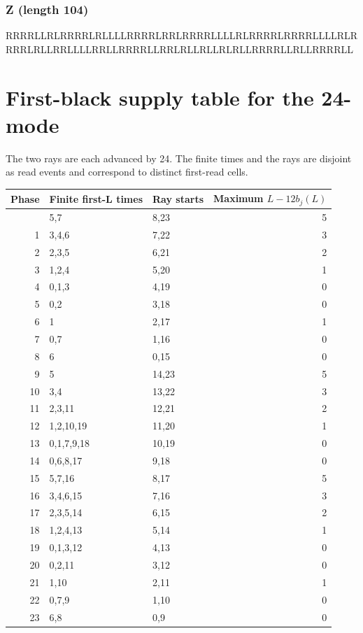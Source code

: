 \documentclass[
  11pt,
]{article}
\newenvironment{Shaded}{}{}
\newcommand{\NormalTok}[1]{#1}
\begin{document}
\subsubsection{Z (length 104)}\label{z-length-104}

\begin{Shaded}
\begin{Highlighting}[]
\NormalTok{RRRRLLRLRRRRLRLLLLRRRRLRRLRRRRLLLLRLRRRRLRRRRLLLLRLR}
\NormalTok{RRRLRLLRRLLLLRRLLRRRRLLRRLRLLRLLRLRLLRRRRLLRLLRRRRLL}
\end{Highlighting}
\end{Shaded}

\clearpage
\section{First-black supply table for the
24-mode}\label{first-black-supply-table-for-the-24-mode}

The two rays are each advanced by 24. The finite times and the rays are
disjoint as read events and correspond to distinct first-read cells.

\begin{longtable}[]{@{}rllr@{}}
\toprule\noalign{}
Phase & Finite first-L times & Ray starts & Maximum \(L-12b_j(L)\) \\
\midrule\noalign{}
\endhead
\bottomrule\noalign{}
\endlastfoot
0 & 5,7 & 8,23 & 5 \\
1 & 3,4,6 & 7,22 & 3 \\
2 & 2,3,5 & 6,21 & 2 \\
3 & 1,2,4 & 5,20 & 1 \\
4 & 0,1,3 & 4,19 & 0 \\
5 & 0,2 & 3,18 & 0 \\
6 & 1 & 2,17 & 1 \\
7 & 0,7 & 1,16 & 0 \\
8 & 6 & 0,15 & 0 \\
9 & 5 & 14,23 & 5 \\
10 & 3,4 & 13,22 & 3 \\
11 & 2,3,11 & 12,21 & 2 \\
12 & 1,2,10,19 & 11,20 & 1 \\
13 & 0,1,7,9,18 & 10,19 & 0 \\
14 & 0,6,8,17 & 9,18 & 0 \\
15 & 5,7,16 & 8,17 & 5 \\
16 & 3,4,6,15 & 7,16 & 3 \\
17 & 2,3,5,14 & 6,15 & 2 \\
18 & 1,2,4,13 & 5,14 & 1 \\
19 & 0,1,3,12 & 4,13 & 0 \\
20 & 0,2,11 & 3,12 & 0 \\
21 & 1,10 & 2,11 & 1 \\
22 & 0,7,9 & 1,10 & 0 \\
23 & 6,8 & 0,9 & 0 \\
\end{longtable}
\end{document}
